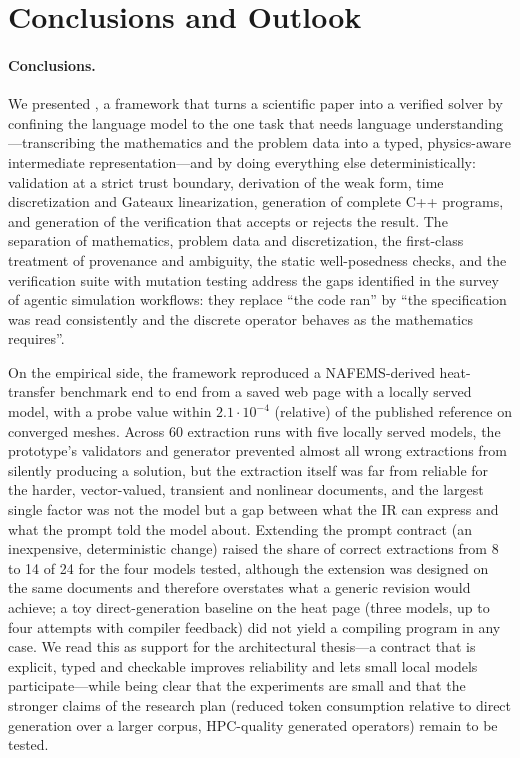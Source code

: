 \section{Conclusions and Outlook}
\label{sec:conclusions}

\paragraph{Conclusions.}
We presented \femagent{}, a framework that turns a scientific paper into a verified \dealii{} solver by confining the language model to the one task that needs language understanding---transcribing the mathematics and the problem data into a typed, physics-aware intermediate representation---and by doing everything else deterministically: validation at a strict trust boundary, derivation of the weak form, time discretization and Gateaux linearization, generation of complete C++ programs, and generation of the verification that accepts or rejects the result. The separation of mathematics, problem data and discretization, the first-class treatment of provenance and ambiguity, the static well-posedness checks, and the verification suite with mutation testing address the gaps identified in the survey of agentic simulation workflows: they replace ``the code ran'' by ``the specification was read consistently and the discrete operator behaves as the mathematics requires''.

On the empirical side, the framework reproduced a NAFEMS-derived heat-transfer benchmark end to end from a saved web page with a locally served model, with a probe value within $2.1\cdot10^{-4}$ (relative) of the published reference on converged meshes. Across 60 extraction runs with five locally served models, the prototype's validators and generator prevented almost all wrong extractions from silently producing a solution, but the extraction itself was far from reliable for the harder, vector-valued, transient and nonlinear documents, and the largest single factor was not the model but a gap between what the IR can express and what the prompt told the model about. Extending the prompt contract (an inexpensive, deterministic change) raised the share of correct extractions from 8 to 14 of 24 for the four models tested, although the extension was designed on the same documents and therefore overstates what a generic revision would achieve; a toy direct-generation baseline on the heat page (three models, up to four attempts with compiler feedback) did not yield a compiling \dealii{} program in any case. We read this as support for the architectural thesis---a contract that is explicit, typed and checkable improves reliability and lets small local models participate---while being clear that the experiments are small and that the stronger claims of the research plan (reduced token consumption relative to direct generation over a larger corpus, HPC-quality generated operators) remain to be tested.

